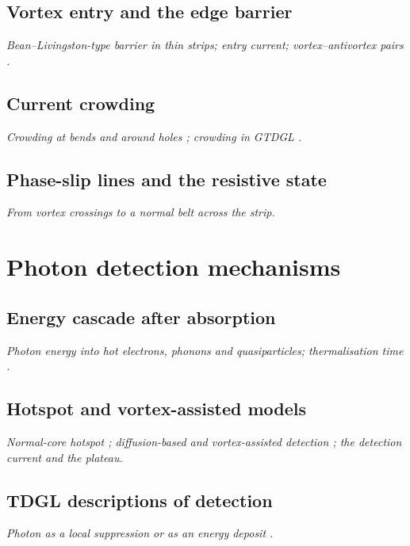 \subsection{Vortex entry and the edge barrier}
\label{sec:th-edge-barrier}
\emph{Bean--Livingston-type barrier in thin strips; entry current; vortex--antivortex pairs \cite{vodolazov2012}.}

\subsection{Current crowding}
\label{sec:th-crowding}
\emph{Crowding at bends and around holes \cite{clem2011}; crowding in GTDGL \cite{jonsson2022}.}

\subsection{Phase-slip lines and the resistive state}
\label{sec:th-psl}
\emph{From vortex crossings to a normal belt across the strip.}

\section{Photon detection mechanisms}
\label{sec:th-detection}

\subsection{Energy cascade after absorption}
\label{sec:th-cascade}
\emph{Photon energy into hot electrons, phonons and quasiparticles; thermalisation time \cite{engel2015,simon2025}.}

\subsection{Hotspot and vortex-assisted models}
\label{sec:th-hotspot}
\emph{Normal-core hotspot \cite{goltsman2001}; diffusion-based and vortex-assisted detection
\cite{bulaevskii2012,bartolf2010,engel2015}; the detection current and the plateau.}

\subsection{TDGL descriptions of detection}
\label{sec:th-tdgl-detection}
\emph{Photon as a local suppression or as an energy deposit \cite{zotova2012,vodolazov2017,simon2025}.}

